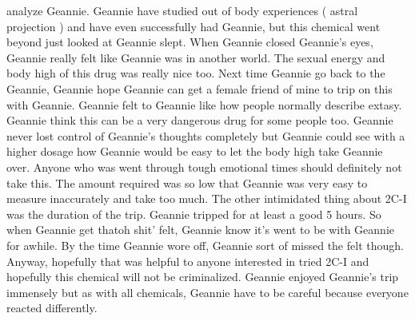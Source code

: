 \documentclass[12pt]{book}
\begin{document}
analyze Geannie. Geannie have studied out of body experiences ( astral projection ) and have even successfully had Geannie, but this chemical went beyond just looked at Geannie slept. When Geannie closed Geannie's eyes, Geannie really felt like Geannie was in another world. The sexual energy and body high of this drug was really nice too. Next time Geannie go back to the Geannie, Geannie hope Geannie can get a female friend of mine to trip on this with Geannie. Geannie felt to Geannie like how people normally describe extasy. Geannie think this can be a very dangerous drug for some people too. Geannie never lost control of Geannie's thoughts completely but Geannie could see with a higher dosage how Geannie would be easy to let the body high take Geannie over. Anyone who was went through tough emotional times should definitely not take this. The amount required was so low that Geannie was very easy to measure inaccurately and take too much. The other intimidated thing about 2C-I was the duration of the trip. Geannie tripped for at least a good 5 hours. So when Geannie get thatoh shit' felt, Geannie know it's went to be with Geannie for awhile. By the time Geannie wore off, Geannie sort of missed the felt though. Anyway, hopefully that was helpful to anyone interested in tried 2C-I and hopefully this chemical will not be criminalized. Geannie enjoyed Geannie's trip immensely but as with all chemicals, Geannie have to be careful because everyone reacted differently.
\end{document}
